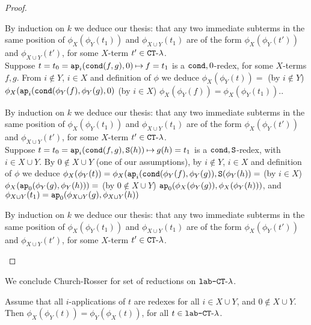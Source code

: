 \begin{proof}
\begin{enumerate}
\begin{enumerate}
By induction on $k$ we deduce our thesis:
that any two immediate subterms in the same position of 
$\phi_{X}(\phi_{Y}(t_1)) $ and $\phi_{X \cup Y}(t_1)$ 
are of the form $\phi_{X}(\phi_{Y}(t')) $ and $\phi_{X \cup Y}(t')$, 
for some $X$-term $t' \in { {\tt CT}\mbox{-}\lambda}$.
\\

Suppose $t = t_0 = {\tt ap}_i({\tt cond}(f,g),0) \mathbin{\mapsto} f = t_1$ is a ${\tt cond},0$-redex, 
for some $X$-terms $f,g$. From $i \not \in Y$, $i \in X$ and definition of $\phi$ we deduce 
$ \phi_X(\phi_Y(t)) = 
$ (by $i \not \in Y$) $
\phi_X({\tt ap}_i( {\tt cond}(\phi_Y(f), \phi_Y(g) , 0) 
$ (by $i \in X$) $
\phi_X(\phi_Y(f)) = 
\phi_X(\phi_Y(t_1))$..

By induction on $k$ we deduce our thesis:
that any two immediate subterms in the same position of 
$\phi_{X}(\phi_{Y}(t_1)) $ and $\phi_{X \cup Y}(t_1)$ 
are of the form $\phi_{X}(\phi_{Y}(t')) $ and $\phi_{X \cup Y}(t')$, 
for some $X$-term $t' \in { {\tt CT}\mbox{-}\lambda}$.
\\

Suppose $t = t_0 = {\tt ap}_i({\tt cond}(f,g),{\tt S}(h)) \mathbin{\mapsto} g(h) = t_1$  is a ${\tt cond},{\tt S}$-redex,  
with $i \in X \cup Y$. By $0 \not \in X \cup Y$ (one of our assumptions),
by $i \not \in Y$, $i \in X$ and definition of $\phi$ we deduce
$ 
\phi_X(\phi_Y(t)) = 
\phi_X({\tt ap}_i( {\tt cond}(\phi_Y(f), \phi_Y(g)), {\tt S}(\phi_Y(h)) =
$ (by $i \in X$) $
\phi_X({\tt ap}_0(\phi_Y(g), \phi_Y(h) ) ) = 
$ (by $0 \not \in X \cup Y$) $
{\tt ap}_0(\phi_X(\phi_Y(g)), \phi_X(\phi_Y(h)) )
$,
and  
$\phi_{X \cup Y}(t_1) = {\tt ap}_0( \phi_{X \cup Y}(g), \phi_{X \cup Y}(h) )$

By induction on $k$ we deduce our thesis:
that any two immediate subterms in the same position of 
$\phi_{X}(\phi_{Y}(t_1)) $ and $\phi_{X \cup Y}(t_1)$ 
are of the form $\phi_{X}(\phi_{Y}(t')) $ and $\phi_{X \cup Y}(t')$, 
for some $X$-term $t' \in { {\tt CT}\mbox{-}\lambda}$.



\end{enumerate}

\end{enumerate}
\end{proof}


We conclude Church-Rosser for set of reductions on ${\mbox{\tt lab-}{ {\tt CT}\mbox{-}\lambda}}$.

\begin{lemma}
\label{lemma-churchrosser-infinite-reduction}
Assume that all $i$-applications of $t$ are redexes for all $i \in X \cup Y$,
and $0 \not \in X \cup Y$.
Then $\phi_{X}(\phi_{Y}(t)) =\phi_{Y}(\phi_{X}(t))$, for all $t \in {\mbox{\tt lab-} { {\tt CT}\mbox{-}\lambda} }$.
\end{lemma}


